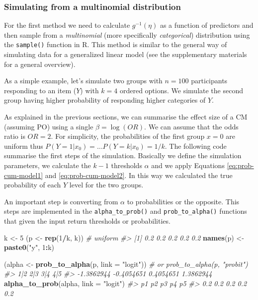 \documentclass[
  man,floatsintext]{apa6}
\newenvironment{Shaded}{\begin{snugshade}}{\end{snugshade}}
\newcommand{\AttributeTok}[1]{\textcolor[rgb]{0.13,0.29,0.53}{#1}}
\newcommand{\CommentTok}[1]{\textcolor[rgb]{0.56,0.35,0.01}{\textit{#1}}}
\newcommand{\DecValTok}[1]{\textcolor[rgb]{0.00,0.00,0.81}{#1}}
\newcommand{\FunctionTok}[1]{\textcolor[rgb]{0.13,0.29,0.53}{\textbf{#1}}}
\newcommand{\NormalTok}[1]{#1}
\newcommand{\OtherTok}[1]{\textcolor[rgb]{0.56,0.35,0.01}{#1}}
\newcommand{\SpecialCharTok}[1]{\textcolor[rgb]{0.81,0.36,0.00}{\textbf{#1}}}
\newcommand{\StringTok}[1]{\textcolor[rgb]{0.31,0.60,0.02}{#1}}
\begin{document}
\subsubsection{Simulating from a multinomial distribution}\label{simulating-from-a-multinomial-distribution}

For the first method we need to calculate \(g^{-1}(\eta)\) as a function of predictors and then sample from a \emph{multinomial} (more specifically \emph{categorical}) distribution using the \texttt{sample()} function in R. This method is similar to the general way of simulating data for a generalized linear model (see the supplementary materials for a general overview).

As a simple example, let's simulate two groups with \(n = 100\) participants responding to an item (\(Y\)) with \(k = 4\) ordered options. We simulate the second group having higher probability of responding higher categories of \(Y\).

As explained in the previous sections, we can summarise the effect size of a CM (assuming PO) using a single \(\beta = \log(OR)\). We can assume that the odds ratio is \(OR = 2\). For simplicity, the probabilities of the first group \(x = 0\) are uniform thus \(P(Y = 1|x_0) = \dots P(Y = k|x_0) = 1/k\). The following code summarise the first steps of the simulation. Basically we define the simulation parameters, we calculate the \(k - 1\) thresholds \(\alpha\) and we apply Equations \eqref{eq:prob-cum-model1} and \eqref{eq:prob-cum-model2}. In this way we calculated the true probability of each \(Y\) level for the two groups.

An important step is converting from \(\alpha\) to probabilities or the opposite. This steps are implemented in the \texttt{alpha\_to\_prob()} and \texttt{prob\_to\_alpha()} functions that given the input return thresholds or probabilities.

\scriptsize

\begin{Shaded}
\begin{Highlighting}[]
\NormalTok{k }\OtherTok{\textless{}{-}} \DecValTok{5}
\NormalTok{(p }\OtherTok{\textless{}{-}} \FunctionTok{rep}\NormalTok{(}\DecValTok{1}\SpecialCharTok{/}\NormalTok{k, k)) }\CommentTok{\# uniform}
\CommentTok{\#\textgreater{} [1] 0.2 0.2 0.2 0.2 0.2}
\FunctionTok{names}\NormalTok{(p) }\OtherTok{\textless{}{-}} \FunctionTok{paste0}\NormalTok{(}\StringTok{"y"}\NormalTok{, }\DecValTok{1}\SpecialCharTok{:}\NormalTok{k)}

\NormalTok{(alpha }\OtherTok{\textless{}{-}} \FunctionTok{prob\_to\_alpha}\NormalTok{(p, }\AttributeTok{link =} \StringTok{"logit"}\NormalTok{)) }\CommentTok{\# or prob\_to\_alpha(p, "probit")}
\CommentTok{\#\textgreater{}        1|2        2|3        3|4        4|5 }
\CommentTok{\#\textgreater{} {-}1.3862944 {-}0.4054651  0.4054651  1.3862944}
\FunctionTok{alpha\_to\_prob}\NormalTok{(alpha, }\AttributeTok{link =} \StringTok{"logit"}\NormalTok{)}
\CommentTok{\#\textgreater{}  p1  p2  p3  p4  p5 }
\CommentTok{\#\textgreater{} 0.2 0.2 0.2 0.2 0.2}
\end{Highlighting}
\end{Shaded}
\end{document}
